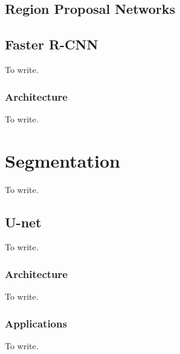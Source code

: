 \subsection{Region Proposal Networks}


\subsection{Faster R-CNN}
To write.

\subsubsection{Architecture}
To write.




\section{Segmentation}
To write.

\subsection{U-net}
To write.

\subsubsection{Architecture}
To write.

\subsubsection{Applications}
To write.

